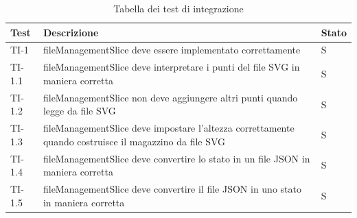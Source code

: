 \begin{xltabular}{0.9\textwidth}{X | p{0.6\textwidth}  | p{0.1\textwidth}}
    \textbf{\color{white} Test} & \textbf{\color{white} Descrizione} & \textbf{\color{white} Stato}\\ 
    \hline
    \endhead
    \caption{Tabella dei test di integrazione} 
    \label{tab:test_sistema}
    \endlastfoot
    TI-1 & fileManagementSlice deve essere implementato correttamente & S\\
    TI-1.1 & fileManagementSlice deve interpretare i punti del file SVG in maniera corretta & S\\
    TI-1.2 & fileManagementSlice non deve aggiungere altri punti quando legge da file SVG & S\\
    TI-1.3 & fileManagementSlice deve impostare l'altezza correttamente quando costruisce il magazzino da file SVG & S\\
    TI-1.4 & fileManagementSlice deve convertire lo stato in un file JSON in maniera corretta & S\\
    TI-1.5 & fileManagementSlice deve convertire il file JSON in uno stato in maniera corretta & S\\


\end{xltabular}

